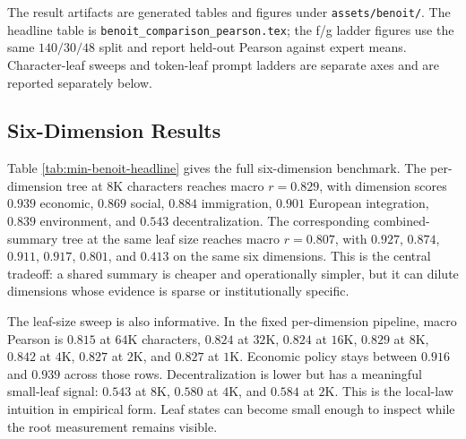 The result artifacts are generated tables and figures under
\texttt{assets/benoit/}. The headline table is
\texttt{benoit\_comparison\_pearson.tex}; the f/g ladder figures use the
same $140/30/48$ split and report held-out Pearson against expert means.
Character-leaf sweeps and token-leaf prompt ladders are separate axes and are
reported separately below.

\subsection{Six-Dimension Results}\label{sec:min-manifesto-six-dim}

\begin{table}[t]
  \centering
  \resizebox{\linewidth}{!}{}
  \caption{\textbf{Pearson $r$ against Benoit expert-survey means.}
  The first block reproduces published Benoit reference rows; the remaining
  blocks report C-TreePO and controls using Gemma-4-31B-NVFP4. The
  per-dimension tree at $8\mathrm{K}$-character leaves reaches macro
  $r=0.829$ while reporting every dimension separately.}
  \label{tab:min-benoit-headline}
\end{table}

Table \ref{tab:min-benoit-headline} gives the full six-dimension benchmark.
The per-dimension tree at $8\mathrm{K}$ characters reaches macro $r=0.829$,
with dimension scores $0.939$ economic, $0.869$ social, $0.884$
immigration, $0.901$ European integration, $0.839$ environment, and $0.543$
decentralization. The corresponding combined-summary tree at the same leaf
size reaches macro $r=0.807$, with $0.927$, $0.874$, $0.911$, $0.917$,
$0.801$, and $0.413$ on the same six dimensions. This is the central
tradeoff: a shared summary is cheaper and operationally simpler, but it can
dilute dimensions whose evidence is sparse or institutionally specific.

The leaf-size sweep is also informative. In the fixed per-dimension pipeline,
macro Pearson is $0.815$ at $64\mathrm{K}$ characters, $0.824$ at
$32\mathrm{K}$, $0.824$ at $16\mathrm{K}$, $0.829$ at $8\mathrm{K}$,
$0.842$ at $4\mathrm{K}$, $0.827$ at $2\mathrm{K}$, and $0.827$ at
$1\mathrm{K}$. Economic policy stays between $0.916$ and $0.939$ across
those rows. Decentralization is lower but has a meaningful small-leaf signal:
$0.543$ at $8\mathrm{K}$, $0.580$ at $4\mathrm{K}$, and $0.584$ at
$2\mathrm{K}$. This is the local-law intuition in empirical form. Leaf
states can become small enough to inspect while the root measurement remains
visible.

